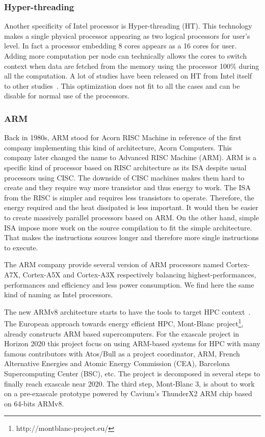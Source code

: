 \subsubsection{Hyper-threading}
Another specificity of Intel processor is Hyper-threading (HT). 
This technology makes a single physical processor appearing as two logical processors for user's level.
In fact a processor embedding 8 cores appears as a 16 cores for user. 
Adding more computation per node can technically allows the cores to switch context when data are fetched from the memory using the processor 100\% during all the computation. 
A lot of studies have been released on HT from Intel itself~\cite{marr2002hyperthreading} to other studies~\cite{bononi2006exploring,leng2002empirical}.
This optimization does not fit to all the cases and can be disable for normal use of the processors. 

\subsubsection{ARM}
Back in 1980s, ARM stood for Acorn RISC Machine in reference of the first company implementing this kind of architecture, Acorn Computers. 
This company later changed the name to Advanced RISC Machine (ARM). 
ARM is a specific kind of processor based on RISC architecture as its ISA despite usual processors using CISC.
The downside of CISC machines makes them hard to create and they require way more transistor and thus energy to work. 
The ISA from the RISC is simpler and requires less transistors to operate. 
Therefore, the energy required and the heat dissipated is less important. 
It would then be easier to create massively parallel processors based on ARM. 
On the other hand, simple ISA impose more work on the source compilation to fit the simple architecture. 
That makes the instructions sources longer and therefore more single instructions to execute. 

The ARM company provide several version of ARM processors named Cortex-A7X, Cortex-A5X and Cortex-A3X respectively balancing highest-performances, performances and efficiency and less power consumption. 
We find here the same kind of naming as Intel processors. 

The new ARMv8 architecture starts to have the tools to target HPC context~\cite{rico2017arm}.
The European approach towards energy efficient HPC, Mont-Blanc project\footnote{http://montblanc-project.eu/}, already constructs ARM based supercomputers. 
For the exascale project in Horizon 2020 this project focus on using ARM-based systems for HPC with many famous contributors with Atos/Bull as a project coordinator, ARM, French Alternative Energies and Atomic Energy Commission (CEA), Barcelona Supercomputing Center (BSC), etc.
The project is decomposed in several steps to finally reach exascale near 2020. 
The third step, Mont-Blanc 3, is about to work on a pre-exascale prototype powered by Cavium’s ThunderX2 ARM chip based on 64-bits ARMv8.

